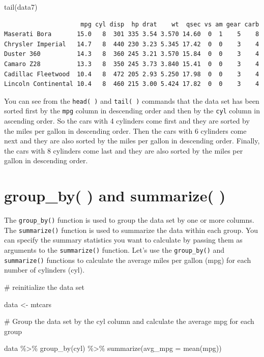 \documentclass[
  letterpaper,
  DIV=11,
  numbers=noendperiod]{scrreprt}
\newenvironment{Shaded}{\begin{snugshade}}{\end{snugshade}}
\newcommand{\AttributeTok}[1]{\textcolor[rgb]{0.40,0.45,0.13}{#1}}
\newcommand{\CommentTok}[1]{\textcolor[rgb]{0.37,0.37,0.37}{#1}}
\newcommand{\FunctionTok}[1]{\textcolor[rgb]{0.28,0.35,0.67}{#1}}
\newcommand{\NormalTok}[1]{\textcolor[rgb]{0.00,0.23,0.31}{#1}}
\newcommand{\OtherTok}[1]{\textcolor[rgb]{0.00,0.23,0.31}{#1}}
\newcommand{\SpecialCharTok}[1]{\textcolor[rgb]{0.37,0.37,0.37}{#1}}
\begin{document}
\begin{Shaded}
\begin{Highlighting}[]
\FunctionTok{tail}\NormalTok{(data7)}
\end{Highlighting}
\end{Shaded}

\begin{verbatim}
                     mpg cyl disp  hp drat    wt  qsec vs am gear carb
Maserati Bora       15.0   8  301 335 3.54 3.570 14.60  0  1    5    8
Chrysler Imperial   14.7   8  440 230 3.23 5.345 17.42  0  0    3    4
Duster 360          14.3   8  360 245 3.21 3.570 15.84  0  0    3    4
Camaro Z28          13.3   8  350 245 3.73 3.840 15.41  0  0    3    4
Cadillac Fleetwood  10.4   8  472 205 2.93 5.250 17.98  0  0    3    4
Lincoln Continental 10.4   8  460 215 3.00 5.424 17.82  0  0    3    4
\end{verbatim}

You can see from the \texttt{head(\ )} and \texttt{tail(\ )} commands
that the data set has been sorted first by the \texttt{mpg} column in
descending order and then by the \texttt{cyl} column in ascending order.
So the cars with 4 cylinders come first and they are sorted by the miles
per gallon in descending order. Then the cars with 6 cylinders come next
and they are also sorted by the miles per gallon in descending order.
Finally, the cars with 8 cylinders come last and they are also sorted by
the miles per gallon in descending order.

\section*{group\_by( ) and summarize( )}\label{group_by-and-summarize}


The \texttt{group\_by()} function is used to group the data set by one
or more columns. The \texttt{summarize()} function is used to summarize
the data within each group. You can specify the summary statistics you
want to calculate by passing them as arguments to the
\texttt{summarize()} function. Let's use the \texttt{group\_by()} and
\texttt{summarize()} functions to calculate the average miles per gallon
(mpg) for each number of cylinders (cyl).

\begin{Shaded}
\begin{Highlighting}[]
\CommentTok{\# reinitialize the data set}

\NormalTok{data }\OtherTok{\textless{}{-}}\NormalTok{ mtcars}

\CommentTok{\# Group the data set by the cyl column and calculate the average mpg for each group}

\NormalTok{data }\SpecialCharTok{\%\textgreater{}\%}
  \FunctionTok{group\_by}\NormalTok{(cyl) }\SpecialCharTok{\%\textgreater{}\%}
  \FunctionTok{summarize}\NormalTok{(}\AttributeTok{avg\_mpg =} \FunctionTok{mean}\NormalTok{(mpg))}
\end{Highlighting}
\end{Shaded}
\end{document}
